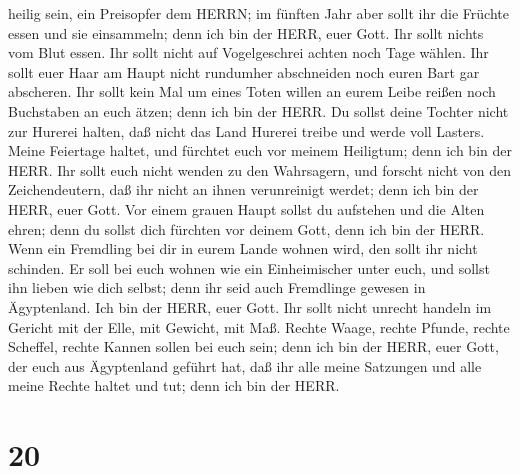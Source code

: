 heilig sein, ein Preisopfer dem HERRN;  im fünften Jahr
aber sollt ihr die Früchte essen und sie einsammeln; denn ich bin der
HERR, euer Gott.  Ihr sollt nichts vom Blut essen. Ihr
sollt nicht auf Vogelgeschrei achten noch Tage wählen.  Ihr
sollt euer Haar am Haupt nicht rundumher abschneiden noch euren Bart gar
abscheren.  Ihr sollt kein Mal um eines Toten willen an
eurem Leibe reißen noch Buchstaben an euch ätzen; denn ich bin der HERR.
 Du sollst deine Tochter nicht zur Hurerei halten, daß
nicht das Land Hurerei treibe und werde voll Lasters. 
Meine Feiertage haltet, und fürchtet euch vor meinem Heiligtum; denn ich
bin der HERR.  Ihr sollt euch nicht wenden zu den
Wahrsagern, und forscht nicht von den Zeichendeutern, daß ihr nicht an
ihnen verunreinigt werdet; denn ich bin der HERR, euer Gott.
 Vor einem grauen Haupt sollst du aufstehen und die Alten
ehren; denn du sollst dich fürchten vor deinem Gott, denn ich bin der
HERR.  Wenn ein Fremdling bei dir in eurem Lande wohnen
wird, den sollt ihr nicht schinden.  Er soll bei euch
wohnen wie ein Einheimischer unter euch, und sollst ihn lieben wie dich
selbst; denn ihr seid auch Fremdlinge gewesen in Ägyptenland. Ich bin
der HERR, euer Gott.  Ihr sollt nicht unrecht handeln im
Gericht mit der Elle, mit Gewicht, mit Maß.  Rechte Waage,
rechte Pfunde, rechte Scheffel, rechte Kannen sollen bei euch sein; denn
ich bin der HERR, euer Gott, der euch aus Ägyptenland geführt hat,
 daß ihr alle meine Satzungen und alle meine Rechte haltet
und tut; denn ich bin der HERR.

\hypertarget{section-19}{%
\section{20}\label{section-19}}

